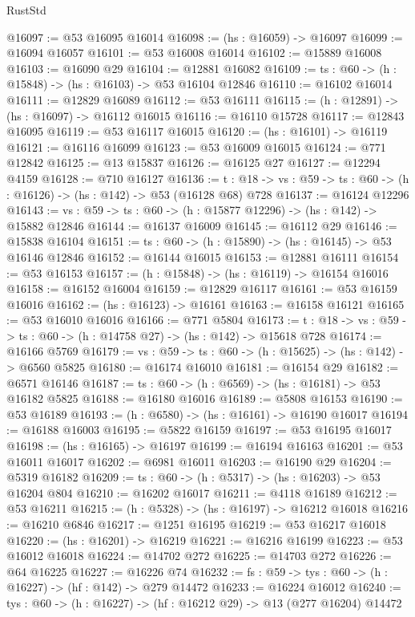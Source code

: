 \begin{lexlean}{RustStd}
\begin{coremodule}
@16097 := @53 @16095 @16014
@16098 := (hs : @16059) -> @16097
@16099 := @16094 @16057
@16101 := @53 @16008 @16014
@16102 := @15889 @16008
@16103 := @16090 @29
@16104 := @12881 @16082
@16109 := {ts : @60} -> (h : @15848) -> (hs : @16103) -> @53 @16104 @12846
@16110 := @16102 @16014
@16111 := @12829 @16089
@16112 := @53 @16111
@16115 := (h : @12891) -> (hs : @16097) -> @16112 @16015
@16116 := @16110 @15728
@16117 := @12843 @16095
@16119 := @53 @16117 @16015
@16120 := (hs : @16101) -> @16119
@16121 := @16116 @16099
@16123 := @53 @16009 @16015
@16124 := @771 @12842
@16125 := @13 @15837
@16126 := @16125 @27
@16127 := @12294 @4159
@16128 := @710 @16127
@16136 := {t : @18} ->
  {vs : @59} -> {ts : @60} -> (h : @16126) -> (hs : @142) -> @53 (@16128 @68) @728
@16137 := @16124 @12296
@16143 := {vs : @59} -> {ts : @60} -> (h : @15877 @12296) -> (hs : @142) -> @15882 @12846
@16144 := @16137 @16009
@16145 := @16112 @29
@16146 := @15838 @16104
@16151 := {ts : @60} -> (h : @15890) -> (hs : @16145) -> @53 @16146 @12846
@16152 := @16144 @16015
@16153 := @12881 @16111
@16154 := @53 @16153
@16157 := (h : @15848) -> (hs : @16119) -> @16154 @16016
@16158 := @16152 @16004
@16159 := @12829 @16117
@16161 := @53 @16159 @16016
@16162 := (hs : @16123) -> @16161
@16163 := @16158 @16121
@16165 := @53 @16010 @16016
@16166 := @771 @5804
@16173 := {t : @18} -> {vs : @59} -> {ts : @60} -> (h : @14758 @27) -> (hs : @142) -> @15618 @728
@16174 := @16166 @5769
@16179 := {vs : @59} -> {ts : @60} -> (h : @15625) -> (hs : @142) -> @6560 @5825
@16180 := @16174 @16010
@16181 := @16154 @29
@16182 := @6571 @16146
@16187 := {ts : @60} -> (h : @6569) -> (hs : @16181) -> @53 @16182 @5825
@16188 := @16180 @16016
@16189 := @5808 @16153
@16190 := @53 @16189
@16193 := (h : @6580) -> (hs : @16161) -> @16190 @16017
@16194 := @16188 @16003
@16195 := @5822 @16159
@16197 := @53 @16195 @16017
@16198 := (hs : @16165) -> @16197
@16199 := @16194 @16163
@16201 := @53 @16011 @16017
@16202 := @6981 @16011
@16203 := @16190 @29
@16204 := @5319 @16182
@16209 := {ts : @60} -> (h : @5317) -> (hs : @16203) -> @53 @16204 @804
@16210 := @16202 @16017
@16211 := @4118 @16189
@16212 := @53 @16211
@16215 := (h : @5328) -> (hs : @16197) -> @16212 @16018
@16216 := @16210 @6846
@16217 := @1251 @16195
@16219 := @53 @16217 @16018
@16220 := (hs : @16201) -> @16219
@16221 := @16216 @16199
@16223 := @53 @16012 @16018
@16224 := @14702 @272
@16225 := @14703 @272
@16226 := @64 @16225
@16227 := @16226 @74
@16232 := {fs : @59} -> {tys : @60} -> (h : @16227) -> (hf : @142) -> @279 @14472
@16233 := @16224 @16012
@16240 := {tys : @60} -> (h : @16227) -> (hf : @16212 @29) -> @13 (@277 @16204) @14472

\end{coremodule}
\end{lexlean}

